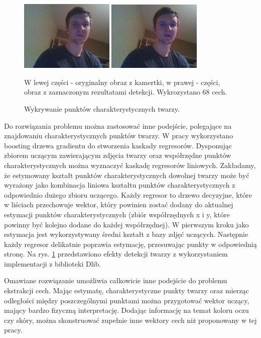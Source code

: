 \documentclass[oneside, eng]{mgr}
\begin{document}
\begin{figure}
\centering
	\includegraphics[width=0.40\textwidth,natwidth=310,natheight=642]{test.jpg}
	\includegraphics[width=0.40\textwidth,natwidth=310,natheight=642]{test_result.jpg}
\caption{Wykrywanie punktów charakterystycznych twarzy.}
W lewej części - oryginalny obraz z kamertki, w prawej - części, obraz z zaznaczonym rezultatami detekcji. Wykrozystano 68 cech.
	\label{fig:face_landmark_detect}
\end{figure}

Do rozwiązania problemu można zastosować inne podejście, polegające na znajdowaniu charakterystycznych punktów twarzy. W pracy \cite{Landmark face detector} wykorzystano boosting drzewa gradientu do stworzenia kaskady regresorów. Dysponując zbiorem uczącym zawierającym zdjęcia twarzy oraz współrzędne punktów charakterystycznych można wyznaczyć kaskadę regresorów liniowych. Zakładamy, że estymowany kształt punktów charakterystycznych dowolnej twarzy może być wyrażony jako kombinacja liniowa kształtu punktów charakterystycznych z odpowiednio dużego zbioru uczącego. Każdy regresor to drzewo decyzyjne, które w liściach przechowuje wektor, który powinien zostać dodany do aktualnej estymacji punktów charakterystycznych (zbiór współrzędnych x i y, które powinny być kolejno dodane do każdej współrzędnej). W pierwszym kroku jako estymacja jest wykorzystywany średni kształt z bazy zdjęć uczących. Następnie każdy regresor delikatnie poprawia estymację, przesuwając punkty w odpowiednią stronę. Na rys. \ref{fig:face_landmark_detect} przedstawiono efekty detekcji twarzy z wykorzystaniem implementacji z biblioteki Dlib.

Omawiane rozwiązanie umożliwia całkowicie inne podejście do problemu ekstrakcji cech. Mając estymatę, charakterystyczne punkty twarzy oraz mierząc odległości między poszczególnymi punktami można przygotować wektor uczący, mający bardzo fizyczną interpretację. Dodając informację na temat koloru oczu czy skóry, można skonstruować zupełnie inne wektory cech niż proponowany w tej pracy. 
\end{document}
